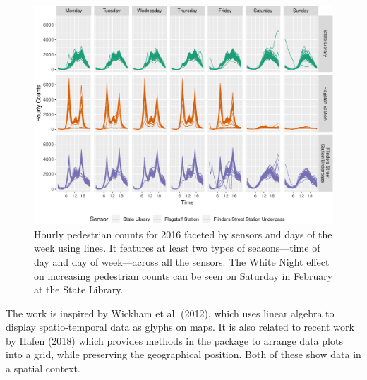 \begin{Schunk}
\begin{figure}

{\centering \includegraphics[width=\textwidth]{figure/facet-time-1} 

}

\caption[Hourly pedestrian counts for 2016 faceted by sensors and days of the week using lines]{Hourly pedestrian counts for 2016 faceted by sensors and days of the week using lines. It features at least two types of seasons---time of day and day of week---across all the sensors. The White Night effect on increasing pedestrian counts can be seen on Saturday in February at the State Library.}\label{fig:facet-time}
\end{figure}
\end{Schunk}

The work is inspired by Wickham et al. (2012), which uses linear algebra
to display spatio-temporal data as glyphs on maps. It is also related to
recent work by Hafen (2018) which provides methods in the
 package to arrange data plots into a grid, while
preserving the geographical position. Both of these show data in a
spatial context.

